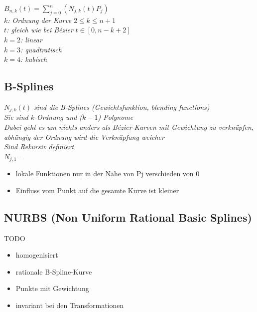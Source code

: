 $B_{n,k}(t) = \displaystyle \sum^n_{j=0}(N_{j,k}(t) P_j)$\\

\textit{$k$: Ordnung der Kurve} $2 \leq k \leq n+1$\\
\textit{$t$: gleich wie bei Bézier} $t \in [0, n-k+2]$\\

\textit{$k=2$: linear}\\
\textit{$k=3$: quadtratisch}\\
\textit{$k=4$: kubisch}

\subsection{B-Splines}

\textit{$N_{j,k}(t)$ sind die B-Splines (Gewichtsfunktion, blending functions)}\\
\textit{Sie sind $k$-Ordnung und ($k-1$) Polynome}\\
\textit{Dabei geht es um nichts anders als Bézier-Kurven mit Gewichtung zu verknüpfen,
abhängig der Ordnung wird die Verknüpfung weicher}\\
\textit{Sind Rekursiv definiert}\\

$N_{j,1} = $

\begin{itemize}
	\item lokale Funktionen nur in der Nähe von Pj verschieden von 0
	\item Einfluss vom Punkt auf die gesamte Kurve ist kleiner
\end{itemize}

\subsection{NURBS (Non Uniform Rational Basic Splines)}
TODO
\begin{itemize}
	\item homogenisiert
	\item rationale B-Spline-Kurve
	\item Punkte mit Gewichtung
	\item invariant bei den Transformationen
\end{itemize}